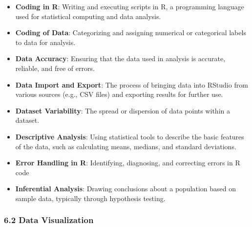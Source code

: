 \documentclass[
]{book}
\providecommand{\tightlist}{%
  \setlength{\itemsep}{0pt}\setlength{\parskip}{0pt}}
\begin{document}
\begin{itemize}
\tightlist
\item
  \textbf{Coding in R}: Writing and executing scripts in R, a programming language used for statistical computing and data analysis.
\item
  \textbf{Coding of Data}: Categorizing and assigning numerical or categorical labels to data for analysis.
\item
  \textbf{Data Accuracy}: Ensuring that the data used in analysis is accurate, reliable, and free of errors.
\item
  \textbf{Data Import and Export}: The process of bringing data into RStudio from various sources (e.g., CSV files) and exporting results for further use.
\item
  \textbf{Dataset Variability}: The spread or dispersion of data points within a dataset.
\item
  \textbf{Descriptive Analysis}: Using statistical tools to describe the basic features of the data, such as calculating means, medians, and standard deviations.
\item
  \textbf{Error Handling in R}: Identifying, diagnosing, and correcting errors in R code
\item
  \textbf{Inferential Analysis}: Drawing conclusions about a population based on sample data, typically through hypothesis testing.
\end{itemize}

\subsubsection*{\texorpdfstring{\textbf{6.2 Data Visualization}}{6.2 Data Visualization}}\label{data-visualization-1}
\end{document}

